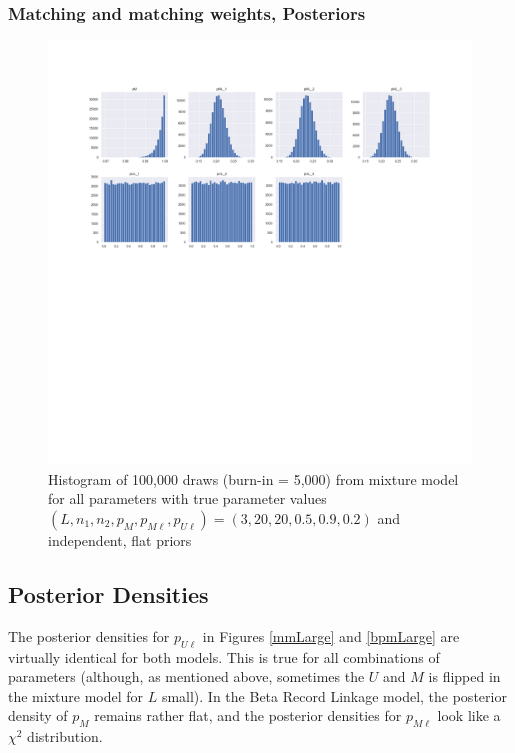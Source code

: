 \documentclass[11pt,reqno]{amsart}
\begin{document}

\subsubsection{Matching and matching weights, Posteriors}




\begin{figure}[h!]
\begin{center}
\includegraphics[width=\textwidth]{../Figures/mm/nM10/allParam_nM10_L3.png}
\vspace{-40pt}
\caption{Histogram of 100,000 draws (burn-in = 5,000) from mixture model for all parameters with true parameter values $(L, n_1, n_2, p_M, p_{M\ell}, p_{U\ell}) = (3, 20, 20, 0.5, 0.9, 0.2)$ and independent, flat priors}
\label{mmFlips}
\end{center}
\end{figure}

\subsection{Posterior Densities}
The posterior densities for $p_{U\ell}$ in Figures \ref{mmLarge} and \ref{bpmLarge} are virtually identical for both models.  This is true for all combinations of parameters (although, as mentioned above, sometimes the $U$ and $M$ is flipped in the mixture model for $L$ small).  In the Beta Record Linkage model, the posterior density of $p_M$ remains rather flat, and the posterior densities for $p_{M\ell}$  look like a $\chi^2$ distribution. 
\end{document}
